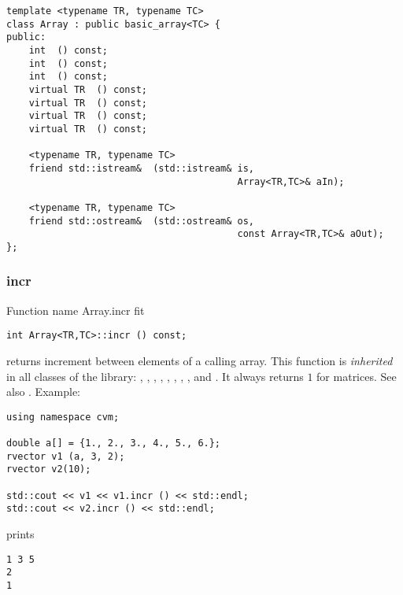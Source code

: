 \bigskip
\noindent%
\verb"template <typename TR, typename TC>"\\
\verb"class Array : public basic_array<TC> {"\\
\verb"public:"\\
\verb"    int "\verb" () const;"\\
\verb"    int "\verb" () const;"\\
\verb"    int "\verb" () const;"\\
\verb"    virtual TR "\verb" () const;"\\
\verb"    virtual TR "\verb" () const;"\\
\verb"    virtual TR "\verb" () const;"\\
\verb"    virtual TR "\verb" () const;"\\
\verb" "\\
\verb"    <typename TR, typename TC>"\\
\verb"    friend std::istream& "\verb" (std::istream& is,"\\
\verb"                                         Array<TR,TC>& aIn);"\\
\verb" "\\
\verb"    <typename TR, typename TC>"\\
\verb"    friend std::ostream& "\verb" (std::ostream& os,"\\
\verb"                                         const Array<TR,TC>& aOut);"\\
\verb"};"
\newpage


\subsubsection{incr}
Function%
\pdfdest name {Array.incr} fit
\begin{Verbatim}
int Array<TR,TC>::incr () const;
\end{Verbatim}
returns  increment between elements of a calling array.
This function is \emph{inherited} in all classes of the library:
,   ,
,   ,
, ,
, ,
 and .
It always returns $1$ for matrices.
See also .
Example:
\begin{Verbatim}
using namespace cvm;

double a[] = {1., 2., 3., 4., 5., 6.};
rvector v1 (a, 3, 2);
rvector v2(10);

std::cout << v1 << v1.incr () << std::endl;
std::cout << v2.incr () << std::endl;
\end{Verbatim}
prints
\begin{Verbatim}
1 3 5
2
1
\end{Verbatim}
\newpage


